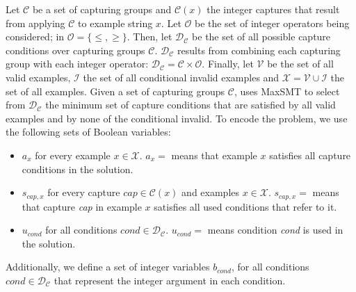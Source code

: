 %
Let \(\mathcal{C}\) be a set of capturing groups and \(\mathcal{C}(x)\) the integer captures that result from applying \(\mathcal{C}\) to example string \(x\).
%
Let \(\mathcal{O}\) be the set of integer operators being considered; in \Forest \(\mathcal{O} = \{\le, \ge\}\). Then, let \(\mathcal{D}_\mathcal{C}\) be the set of all possible capture conditions over capturing groups \(\mathcal{C}\).
\(\mathcal{D}_\mathcal{C}\) results from combining each capturing group with each integer operator: \(\mathcal{D}_\mathcal{C} = \mathcal{C} \times \mathcal{O}\).
%
Finally, let \(\mathcal{V}\) be the set of all valid examples, \(\mathcal{I}\) the set of all conditional invalid examples and \(\mathcal{X} = \mathcal{V} \cup \mathcal{I}\) the set of all examples.
Given a set of capturing groups \(\mathcal{C}\), \Forest uses \ac{MaxSMT} to select from \(\mathcal{D}_\mathcal{C}\) the minimum set of capture conditions that are satisfied by all valid examples and by none of the conditional invalid. To encode the problem, we use the following sets of Boolean variables:
\begin{itemize}
    \item \(a_x\) for every example \(x \in \mathcal{X}\).
    \(a_x = \) \true means that example \(x\) satisfies all capture conditions in the solution.



    \item \(s_{\textit{cap}, x}\) for every capture \(\textit{cap} \in \mathcal{C}(x)\) and examples \(x \in \mathcal{X}\).
    \(s_{\textit{cap}, x} =\) \true means that capture \textit{cap} in example \(x\) satisfies all used conditions that refer to it.

    
    \item \(u_{\textit{cond}}\) for all conditions \(\textit{cond} \in \mathcal{D}_\mathcal{C}\). 
    \(u_{\textit{cond}} = \) \true means condition \textit{cond} is used in the solution.
\end{itemize}

Additionally, we define a set of integer variables \(b_{\textit{cond}}\), for all conditions \(\textit{cond} \in \mathcal{D}_\mathcal{C}\) that represent the integer argument in each condition.


